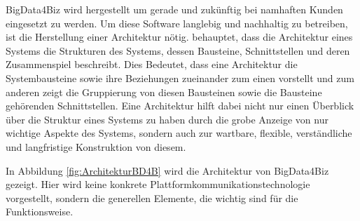 
BigData4Biz wird hergestellt um gerade und zukünftig bei namhaften Kunden eingesetzt zu werden. Um diese Software langlebig und nachhaltig zu betreiben, ist die Herstellung einer Architektur nötig. \cite{SHR11} behauptet, dass die Architektur eines Systems die Strukturen des Systems, dessen Bausteine, Schnittstellen und deren Zusammenspiel beschreibt.  Dies Bedeutet, dass eine Architektur die Systembausteine sowie ihre Beziehungen zueinander zum einen vorstellt und zum anderen zeigt die Gruppierung von diesen Bausteinen sowie die Bausteine gehörenden Schnittstellen. Eine Architektur hilft dabei nicht nur einen Überblick über die Struktur eines Systems zu haben durch die grobe Anzeige von nur wichtige Aspekte des Systems, sondern auch zur wartbare, flexible, verständliche und langfristige Konstruktion von diesem.

In Abbildung \ref{fig:ArchitekturBD4B} wird die Architektur von BigData4Biz gezeigt. Hier wird keine konkrete Plattformkommunikationstechnologie vorgestellt, sondern die generellen Elemente, die wichtig sind für die Funktionsweise.



